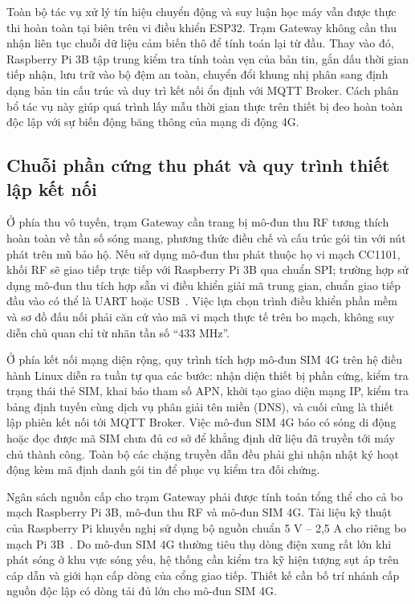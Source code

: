 Toàn bộ tác vụ xử lý tín hiệu chuyển động và suy luận học máy vẫn được thực thi hoàn toàn tại biên trên vi điều khiển ESP32. Trạm Gateway không cần thu nhận liên tục chuỗi dữ liệu cảm biến thô để tính toán lại từ đầu. Thay vào đó, Raspberry Pi 3B tập trung kiểm tra tính toàn vẹn của bản tin, gắn dấu thời gian tiếp nhận, lưu trữ vào bộ đệm an toàn, chuyển đổi khung nhị phân sang định dạng bản tin cấu trúc và duy trì kết nối ổn định với MQTT Broker. Cách phân bổ tác vụ này giúp quá trình lấy mẫu thời gian thực trên thiết bị đeo hoàn toàn độc lập với sự biến động băng thông của mạng di động 4G.

\subsection{Chuỗi phần cứng thu phát và quy trình thiết lập kết nối}
Ở phía thu vô tuyến, trạm Gateway cần trang bị mô-đun thu RF tương thích hoàn toàn về tần số sóng mang, phương thức điều chế và cấu trúc gói tin với nút phát trên mũ bảo hộ. Nếu sử dụng mô-đun thu phát thuộc họ vi mạch CC1101, khối RF sẽ giao tiếp trực tiếp với Raspberry Pi 3B qua chuẩn SPI; trường hợp sử dụng mô-đun thu tích hợp sẵn vi điều khiển giải mã trung gian, chuẩn giao tiếp đầu vào có thể là UART hoặc USB~\cite{cc1101}. Việc lựa chọn trình điều khiển phần mềm và sơ đồ đấu nối phải căn cứ vào mã vi mạch thực tế trên bo mạch, không suy diễn chủ quan chỉ từ nhãn tần số ``433 MHz''.

Ở phía kết nối mạng diện rộng, quy trình tích hợp mô-đun SIM 4G trên hệ điều hành Linux diễn ra tuần tự qua các bước: nhận diện thiết bị phần cứng, kiểm tra trạng thái thẻ SIM, khai báo tham số APN, khởi tạo giao diện mạng IP, kiểm tra bảng định tuyến cùng dịch vụ phân giải tên miền (DNS), và cuối cùng là thiết lập phiên kết nối tới MQTT Broker. Việc mô-đun SIM 4G báo có sóng di động hoặc đọc được mã SIM chưa đủ cơ sở để khẳng định dữ liệu đã truyền tới máy chủ thành công. Toàn bộ các chặng truyền dẫn đều phải ghi nhận nhật ký hoạt động kèm mã định danh gói tin để phục vụ kiểm tra đối chứng.

Ngân sách nguồn cấp cho trạm Gateway phải được tính toán tổng thể cho cả bo mạch Raspberry Pi 3B, mô-đun thu RF và mô-đun SIM 4G. Tài liệu kỹ thuật của Raspberry Pi khuyến nghị sử dụng bộ nguồn chuẩn 5 V -- 2,5 A cho riêng bo mạch Pi 3B~\cite{pipower}. Do mô-đun SIM 4G thường tiêu thụ dòng điện xung rất lớn khi phát sóng ở khu vực sóng yếu, hệ thống cần kiểm tra kỹ hiện tượng sụt áp trên cáp dẫn và giới hạn cấp dòng của cổng giao tiếp. Thiết kế cần bố trí nhánh cấp nguồn độc lập có dòng tải đủ lớn cho mô-đun SIM 4G.

